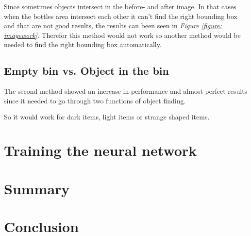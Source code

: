 Since sometimes objects intersect in the before- and after image. In that cases when the bottles area intersect each other it can't find the right bounding box and that are not good results, the results can been seen in \textit{Figure \ref{figure: imagework}}. Therefor this method would not work so another method would be needed to find the right bounding box automatically. 

\subsection{Empty bin vs. Object in the bin}
The second method showed an increase in performance and almost perfect results since it needed to go through two functions of object finding. 

So it would work for dark items, light items or strange shaped items.

\section{Training the neural network}




\section{Summary}

\section{Conclusion\label{sec:conclusions}}
